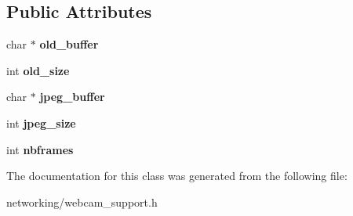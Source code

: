 \subsection*{Public Attributes}
\begin{DoxyCompactItemize}
\item 
char $\ast$ {\bfseries old\+\_\+buffer}\hypertarget{classWebcamSupport_ac40ab068a4fb1bfbaa69b6770883edf2}{}\label{classWebcamSupport_ac40ab068a4fb1bfbaa69b6770883edf2}

\item 
int {\bfseries old\+\_\+size}\hypertarget{classWebcamSupport_abde8000b73fd990ffde177c3c955526b}{}\label{classWebcamSupport_abde8000b73fd990ffde177c3c955526b}

\item 
char $\ast$ {\bfseries jpeg\+\_\+buffer}\hypertarget{classWebcamSupport_ad7343d0acee4696e60cbfdd84ac0a391}{}\label{classWebcamSupport_ad7343d0acee4696e60cbfdd84ac0a391}

\item 
int {\bfseries jpeg\+\_\+size}\hypertarget{classWebcamSupport_aab0ccec6887d704000410d6c4300c0fe}{}\label{classWebcamSupport_aab0ccec6887d704000410d6c4300c0fe}

\item 
int {\bfseries nbframes}\hypertarget{classWebcamSupport_a3fde17f9726d885505fe83208c587411}{}\label{classWebcamSupport_a3fde17f9726d885505fe83208c587411}

\end{DoxyCompactItemize}


The documentation for this class was generated from the following file\+:\begin{DoxyCompactItemize}
\item 
networking/webcam\+\_\+support.\+h\end{DoxyCompactItemize}
